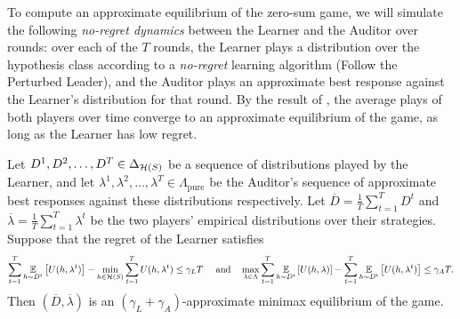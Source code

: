 To compute an approximate equilibrium of the zero-sum game, we will
simulate the following \emph{no-regret dynamics} between the Learner
and the Auditor over rounds: over each of the $T$ rounds, the Learner
plays a distribution over the hypothesis class according to a
\emph{no-regret} learning algorithm (Follow the Perturbed Leader), and the Auditor plays an
approximate best response against the Learner's distribution for that
round. By the result of \cite{FS96}, the average plays of both players
over time converge to an approximate equilibrium of the game, as long
as the Learner has low regret.

\begin{theorem}[\cite{FS96}]\label{fs}
  Let $D^1, D^2 , \ldots , D^T\in \Delta_{\mathcal{H}(S)}$ be a sequence of
  distributions played by the Learner, and let
  $\lambda^1, \lambda^2 , \ldots , \lambda^T \in
  \Lambda_{\textrm{pure}}$ be the Auditor's sequence of approximate
  best responses against these distributions respectively. Let
  $\overline D = \frac{1}{T} \sum_{t=1}^T D^t$ and
  $\overline \lambda = \frac{1}{T}\sum_{t=1}^T \lambda^t$ be the two
  players' empirical distributions over their strategies. Suppose that
  the regret of the Learner satisfies
  \[
    \sum_{t= 1}^T \operatorname*{\mathbb{E}}_{h\sim D^t}\left[U(h, \lambda^t)\right] - \min_{h\in
      \mathcal{H}(S)}\sum_{t=1}^T U(h, \lambda^t) \leq \gamma_L T \quad \mbox{
      and} \quad \max_{\lambda\in \Lambda} \sum_{t= 1}^T \operatorname*{\mathbb{E}}_{h\sim
      D^t}\left[U(h, \lambda)\right] - \sum_{t=1}^T \operatorname*{\mathbb{E}}_{h\sim D^t}\left[U(h,
      \lambda^t)\right] \leq \gamma_A T.
  \]
  Then $(\overline D, \overline \lambda)$ is an
  $(\gamma_L + \gamma_A)$-approximate minimax equilibrium of the game.
\end{theorem}



